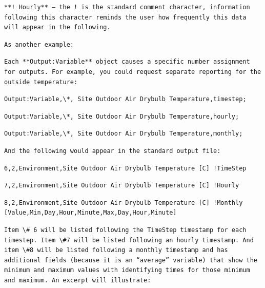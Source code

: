 \begin{lstlisting}
**! Hourly** – the ! is the standard comment character, information following this character reminds the user how frequently this data will appear in the following.
\end{lstlisting}

\begin{lstlisting}
As another example:
\end{lstlisting}

\begin{lstlisting}
Each **Output:Variable** object causes a specific number assignment for outputs. For example, you could request separate reporting for the outside temperature:
\end{lstlisting}

\begin{lstlisting}
Output:Variable,\*, Site Outdoor Air Drybulb Temperature,timestep;
\end{lstlisting}

\begin{lstlisting}
Output:Variable,\*, Site Outdoor Air Drybulb Temperature,hourly;
\end{lstlisting}

\begin{lstlisting}
Output:Variable,\*, Site Outdoor Air Drybulb Temperature,monthly;
\end{lstlisting}

\begin{lstlisting}
And the following would appear in the standard output file:
\end{lstlisting}

\begin{lstlisting}
6,2,Environment,Site Outdoor Air Drybulb Temperature [C] !TimeStep
\end{lstlisting}

\begin{lstlisting}
7,2,Environment,Site Outdoor Air Drybulb Temperature [C] !Hourly
\end{lstlisting}

\begin{lstlisting}
8,2,Environment,Site Outdoor Air Drybulb Temperature [C] !Monthly [Value,Min,Day,Hour,Minute,Max,Day,Hour,Minute]
\end{lstlisting}

\begin{lstlisting}
Item \# 6 will be listed following the TimeStep timestamp for each timestep. Item \#7 will be listed following an hourly timestamp. And item \#8 will be listed following a monthly timestamp and has additional fields (because it is an “average” variable) that show the minimum and maximum values with identifying times for those minimum and maximum. An excerpt will illustrate:
\end{lstlisting}

